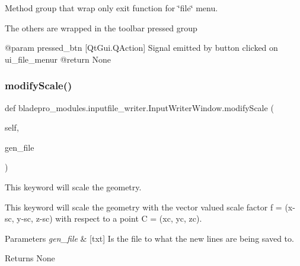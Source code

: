 Method group that wrap only exit function for \char`\"{}file\char`\"{} menu. 

The others are wrapped in the toolbar pressed group \begin{DoxyVerb}   @param pressed_btn [QtGui.QAction] Signal emitted by button clicked on ui_file_menur
   @return None\end{DoxyVerb}
 \hypertarget{a00070_aa1bef88b3d57a567e44548155e7ec02f}{}\label{a00070_aa1bef88b3d57a567e44548155e7ec02f} 
\subsubsection{\texorpdfstring{modify\+Scale()}{modifyScale()}}
{\footnotesize\ttfamily def bladepro\+\_\+modules.\+inputfile\+\_\+writer.\+Input\+Writer\+Window.\+modify\+Scale (\begin{DoxyParamCaption}\item[{}]{self,  }\item[{}]{gen\+\_\+file }\end{DoxyParamCaption})}



This keyword will scale the geometry. 

This keyword will scale the geometry with the vector valued scale factor f = (x-\/sc, y-\/sc, z-\/sc) with respect to a point C = (xc, yc, zc).


\begin{DoxyParams}{Parameters}
{\em gen\+\_\+file} & \mbox{[}txt\mbox{]} Is the file to what the new lines are being saved to. \\
\hline
\end{DoxyParams}
\begin{DoxyReturn}{Returns}
None 
\end{DoxyReturn}
\hypertarget{a00070_a66f6209a0c4caa0ba5e25b5fd913eff5}{}\label{a00070_a66f6209a0c4caa0ba5e25b5fd913eff5} 
